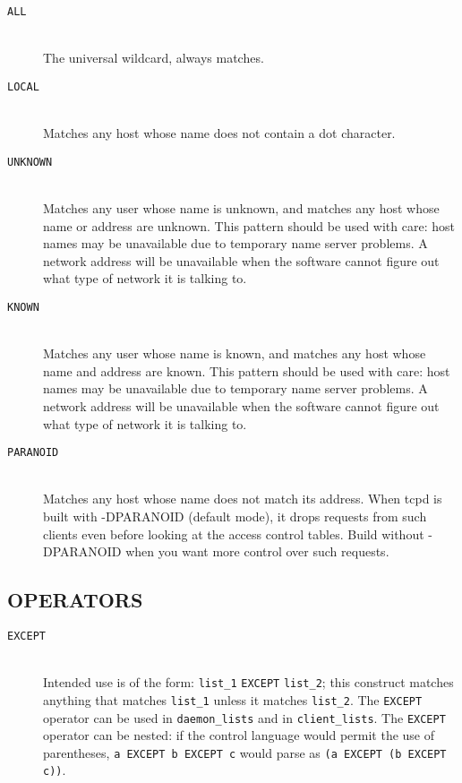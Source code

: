\documentclass[11pt,twoside,a4paper]{book}
\begin{document}
\begin{description}
\item[\tt ALL]\mbox{}\\
The universal wildcard, always matches.

\item[\tt LOCAL]\mbox{}\\
Matches any host whose name does not contain a dot
character.

\item[\tt UNKNOWN]\mbox{}\\
Matches any user whose name is unknown, and matches
any host whose name or address are unknown.  This pattern should be
used with care: host names may be unavailable due to temporary name
server problems. A network address will be unavailable when the
software cannot figure out what type of network it is talking to.

\item[\tt KNOWN]\mbox{}\\
Matches any user whose name is known, and matches any
host whose name and address are known. This pattern should be used
with care: host names may be unavailable due to temporary name server
problems.  A network address will be unavailable when the software
cannot figure out what type of network it is talking to.

\item[\tt PARANOID]\mbox{}\\
Matches any host whose name does not match its
address.  When tcpd is built with -DPARANOID (default mode), it drops
requests from such clients even before looking at the access control
tables.  Build without -DPARANOID when you want more control over such
requests.

\end{description}

\subsection*{OPERATORS}

\begin{description}

\item[\tt EXCEPT]\mbox{}\\
Intended use is of the form: \texttt{list\_1} \texttt{EXCEPT}
\texttt{list\_2}; this construct matches anything that matches
\texttt{list\_1} unless it matches \texttt{list\_2}.  The
\texttt{EXCEPT} operator can be used in \texttt{daemon\_lists} and in
\texttt{client\_lists}. The \texttt{EXCEPT} operator can be nested: if
the control language would permit the use of parentheses, \texttt{a
EXCEPT b EXCEPT c} would parse as \texttt{(a EXCEPT (b EXCEPT c))}.

\end{description}
\end{document}
